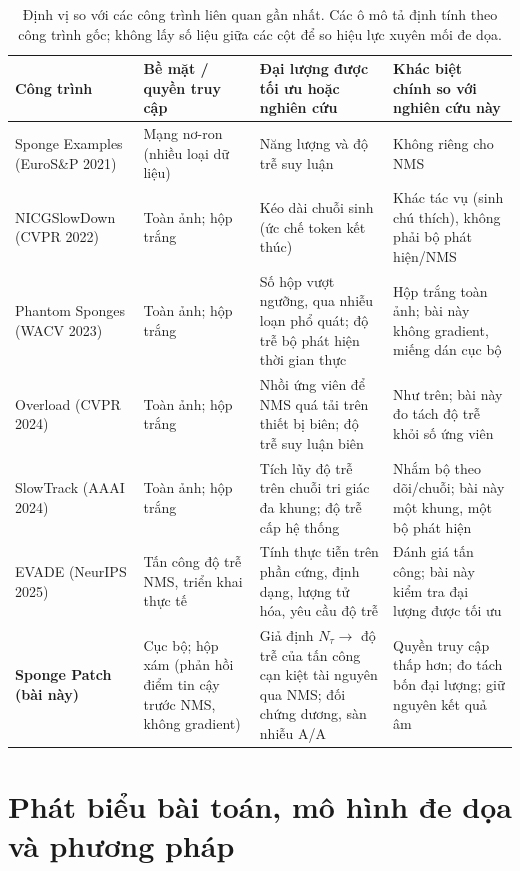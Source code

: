 \documentclass[a4paper,fleqn]{cas-dc}
\newcommand{\Ntau}{N_{\tau}}
\begin{document}
\begin{table}[!tp]
\centering\small
\caption{Định vị so với các công trình liên quan gần nhất. Các ô mô tả định tính theo công trình gốc; không lấy số liệu giữa các cột để so hiệu lực xuyên mối đe dọa.}
\label{tab:related}
\begin{tabularx}{\textwidth}{@{}p{2.8cm}p{3.1cm}p{3.6cm}X@{}}
\toprule
Công trình & Bề mặt / quyền truy cập & Đại lượng được tối ưu hoặc nghiên cứu & Khác biệt chính so với nghiên cứu này \\
\midrule
Sponge Examples \cite{shumailov2021sponge} (EuroS\&P 2021) & Mạng nơ-ron (nhiều loại dữ liệu) & Năng lượng và độ trễ suy luận & Không riêng cho NMS \\
NICGSlowDown \cite{nicgslowdown2022} (CVPR 2022) & Toàn ảnh; hộp trắng & Kéo dài chuỗi sinh (ức chế token kết thúc) & Khác tác vụ (sinh chú thích), không phải bộ phát hiện/NMS \\
Phantom Sponges \cite{phantom2023} (WACV 2023) & Toàn ảnh; hộp trắng & Số hộp vượt ngưỡng, qua nhiễu loạn phổ quát; độ trễ bộ phát hiện thời gian thực & Hộp trắng toàn ảnh; bài này không gradient, miếng dán cục bộ \\
Overload \cite{overload2024} (CVPR 2024) & Toàn ảnh; hộp trắng & Nhồi ứng viên để NMS quá tải trên thiết bị biên; độ trễ suy luận biên & Như trên; bài này đo tách độ trễ khỏi số ứng viên \\
SlowTrack \cite{slowtrack2024} (AAAI 2024) & Toàn ảnh; hộp trắng & Tích lũy độ trễ trên chuỗi tri giác đa khung; độ trễ cấp hệ thống & Nhắm bộ theo dõi/chuỗi; bài này một khung, một bộ phát hiện \\
EVADE \cite{evade2025} (NeurIPS 2025) & Tấn công độ trễ NMS, triển khai thực tế & Tính thực tiễn trên phần cứng, định dạng, lượng tử hóa, yêu cầu độ trễ & Đánh giá tấn công; bài này kiểm tra đại lượng được tối ưu \\
\textbf{Sponge Patch (bài này)} & Cục bộ; hộp xám (phản hồi điểm tin cậy trước NMS, không gradient) & Giả định $\Ntau \to$ độ trễ của tấn công cạn kiệt tài nguyên qua NMS; đối chứng dương, sàn nhiễu A/A & Quyền truy cập thấp hơn; đo tách bốn đại lượng; giữ nguyên kết quả âm \\
\bottomrule
\end{tabularx}
\end{table}

\section{Phát biểu bài toán, mô hình đe dọa và phương pháp}
\label{sec:formal}
\end{document}
